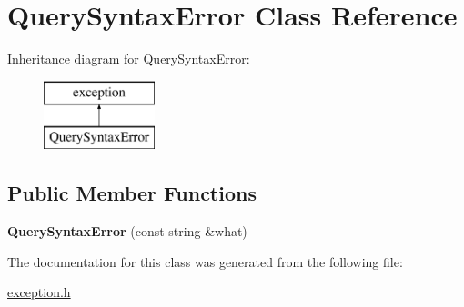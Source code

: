 \hypertarget{class_query_syntax_error}{\section{Query\-Syntax\-Error Class Reference}
\label{class_query_syntax_error}
}
Inheritance diagram for Query\-Syntax\-Error\-:\begin{figure}[H]
\begin{center}
\leavevmode
\includegraphics[height=2.000000cm]{class_query_syntax_error}
\end{center}
\end{figure}
\subsection*{Public Member Functions}
\begin{DoxyCompactItemize}
\item 
\hypertarget{class_query_syntax_error_a6259e7507e71776067ee7d36829931d0}{{\bfseries Query\-Syntax\-Error} (const string \&what)}\label{class_query_syntax_error_a6259e7507e71776067ee7d36829931d0}

\end{DoxyCompactItemize}


The documentation for this class was generated from the following file\-:\begin{DoxyCompactItemize}
\item 
\hyperlink{exception_8h}{exception.\-h}\end{DoxyCompactItemize}
